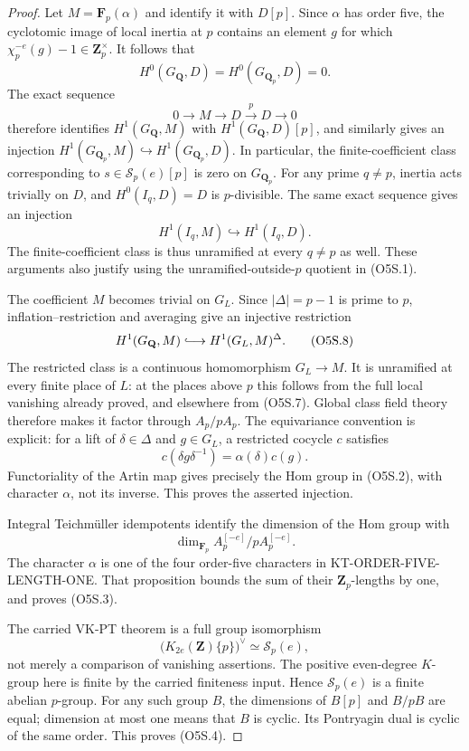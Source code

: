 \documentclass[11pt,a4paper]{article}
\theoremstyle{definition}
\begin{document}
\begin{proof}
Let $M=\mathbf F_p(\alpha)$ and identify it with $D[p]$.
Since $\alpha$ has order five, the cyclotomic image of local
inertia at $p$ contains an element $g$ for which
$\chi_p^{-e}(g)-1\in\mathbf Z_p^\times$.
It follows that
\[
 H^0(G_{\mathbf Q},D)=H^0(G_{\mathbf Q_p},D)=0.
 \tag{O5S.5}
\]
The exact sequence
\[
          0\longrightarrow M\longrightarrow D
            \xrightarrow{\ p\ }D\longrightarrow0
 \tag{O5S.6}
\]
therefore identifies $H^1(G_{\mathbf Q},M)$ with
$H^1(G_{\mathbf Q},D)[p]$, and similarly gives an injection
$H^1(G_{\mathbf Q_p},M)\hookrightarrow
H^1(G_{\mathbf Q_p},D)$.
In particular, the finite-coefficient class corresponding to
$s\in\mathcal S_p(e)[p]$ is zero on $G_{\mathbf Q_p}$.
For any prime $q\ne p$, inertia acts trivially on $D$,
and $H^0(I_q,D)=D$ is $p$-divisible.
The same exact sequence gives an injection
\[
                    H^1(I_q,M)\hookrightarrow H^1(I_q,D).
 \tag{O5S.7}
\]
The finite-coefficient class is thus unramified at every
$q\ne p$ as well.  These arguments also justify using the
unramified-outside-$p$ quotient in (O5S.1).

The coefficient $M$ becomes trivial on $G_L$.
Since $|\Delta|=p-1$ is prime to $p$, inflation--restriction
and averaging give an injective restriction
\[
 H^1(G_{\mathbf Q},M)\lhook\joinrel\longrightarrow
 H^1(G_L,M)^\Delta.
 \tag{O5S.8}
\]
The restricted class is a continuous homomorphism $G_L\to M$.
It is unramified at every finite place of $L$: at the places
above $p$ this follows from the full local vanishing already
proved, and elsewhere from (O5S.7).
Global class field theory therefore makes it factor through
$A_p/pA_p$.
The equivariance convention is explicit: for a lift of
$\delta\in\Delta$ and $g\in G_L$, a restricted cocycle $c$
satisfies
\[
                  c(\delta g\delta^{-1})=\alpha(\delta)c(g).
 \tag{O5S.9}
\]
Functoriality of the Artin map gives precisely the Hom group
in (O5S.2), with character $\alpha$, not its inverse.
This proves the asserted injection.

Integral Teichm\"uller idempotents identify the dimension of
the Hom group with
\[
          \dim_{\mathbf F_p}
             A_p^{[-e]}/pA_p^{[-e]}.
 \tag{O5S.10}
\]
The character $\alpha$ is one of the four order-five characters
in KT-ORDER-FIVE-LENGTH-ONE.  That proposition bounds the sum
of their $\mathbf Z_p$-lengths by one, and proves (O5S.3).

The carried VK-PT theorem is a full group isomorphism
\[
              \bigl(K_{2e}(\mathbf Z)\{p\}\bigr)^\vee
                       \simeq\mathcal S_p(e),
 \tag{O5S.11}
\]
not merely a comparison of vanishing assertions.
The positive even-degree $K$-group here is finite by the
carried finiteness input.  Hence $\mathcal S_p(e)$ is a finite
abelian $p$-group.  For any such group $B$, the dimensions of
$B[p]$ and $B/pB$ are equal; dimension at most one means that
$B$ is cyclic.  Its Pontryagin dual is cyclic of the same
order.  This proves (O5S.4).
\end{proof}
\end{document}
